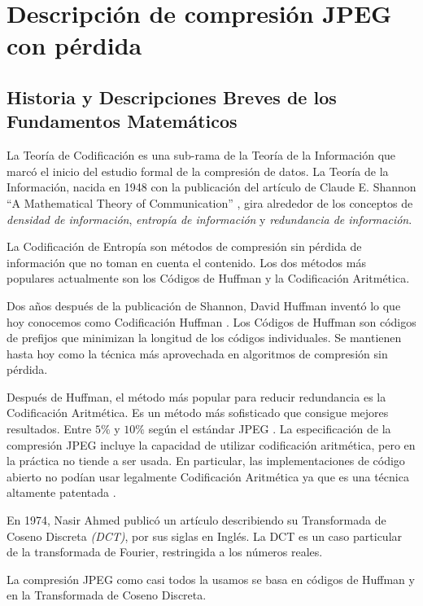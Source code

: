 \chapter{Descripción de compresión JPEG con pérdida}\label{ch:jpeg_desc}

\section{Historia y Descripciones Breves de los Fundamentos Matemáticos}

La \gls{Teoría de Codificación} es una sub-rama de la Teoría de la Información que
marcó el inicio del estudio formal de la compresión de datos. La Teoría de la
Información, nacida en 1948 con la publicación del artículo de Claude E.
Shannon ``A Mathematical Theory of Communication'' \cite{shannon}, gira
alrededor de los conceptos de \emph{densidad de información}, \emph{entropía de
información} y \emph{redundancia de información}.

La Codificación de Entropía son métodos de compresión sin pérdida de
información que no toman en cuenta el contenido. Los dos métodos más populares
actualmente son los Códigos de Huffman y la Codificación Aritmética.

Dos años después de la publicación de Shannon, David Huffman inventó lo que hoy
conocemos como Codificación Huffman \cite{Huffman}. Los Códigos de Huffman son
códigos de prefijos que minimizan la longitud de los códigos individuales. Se
mantienen hasta hoy como la técnica más aprovechada en algoritmos de compresión
sin pérdida.

Después de Huffman, el método más popular para reducir redundancia es la
Codificación Aritmética. Es un método más sofisticado que consigue mejores
resultados. Entre $5\%$ y $10\%$ según el estándar JPEG \cite{jpeg-spec}. La
especificación de la compresión JPEG incluye la capacidad de utilizar
codificación aritmética, pero en la práctica no tiende a ser usada. En
particular, las implementaciones de código abierto no podían usar legalmente
Codificación Aritmética ya que es una técnica altamente patentada
\cite{jpeg_patents}.

En 1974, Nasir Ahmed publicó un artículo describiendo su Transformada de Coseno
Discreta \emph{(DCT)}, por sus siglas en Inglés. La DCT es un caso particular
de la transformada de Fourier, restringida a los números reales.

La compresión JPEG como casi todos la usamos se basa en códigos de Huffman y en
la Transformada de Coseno Discreta.

